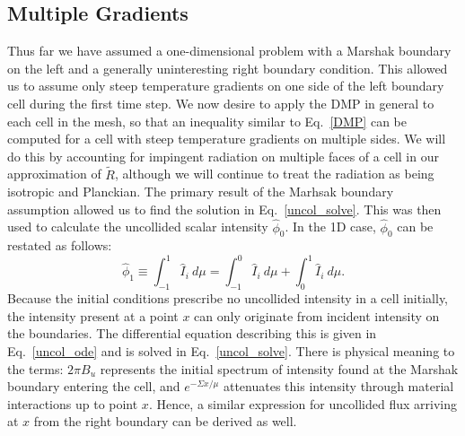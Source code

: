 %
%
\aboveSubSecSkip
\subsection{Multiple Gradients}
Thus far we have assumed a one-dimensional problem with a Marshak boundary on the
left and a generally uninteresting right boundary condition. 
This allowed us to assume only steep temperature gradients on one side of the
left boundary cell during the first time step. We now desire to apply the DMP in
general to each cell in the mesh, so
that an inequality similar to Eq.\ \eqref{DMP} can be computed for a cell with
steep temperature gradients on
multiple sides.  We will do this by accounting for impingent radiation on
multiple faces of a cell in our approximation of $\tilde R$, although we will continue to treat the radiation as
being isotropic and Planckian.  The primary result of the Marhsak boundary assumption
allowed us to
find the solution in Eq.\ \eqref{uncol_solve}.  This was then used to calculate
the uncollided scalar intensity $\hat\phi_0$.  In the 1D case, $\hat\phi_0$ can
be restated as follows:
\begin{equation}
\hat\phi_1\equiv\int_{-1}^1 \hat I_i\ d\mu = \int_{-1}^0 \hat I_i\ d\mu + 
  \int_0^1 \hat I_i\ d\mu. \label{uncol_gen}
\end{equation}
Because the initial conditions prescribe no uncollided intensity in a cell
initially, the intensity present at a point $x$ can only originate from incident
intensity on the boundaries.  The differential equation describing this is
given in Eq.\ \eqref{uncol_ode} and is solved in Eq.\ \eqref{uncol_solve}. 
There is physical meaning to the terms: $2\pi B_u$ represents the initial
spectrum of intensity found at the Marshak boundary entering the cell, and
$e^{-\Sigma x/\mu}$ attenuates this intensity through material interactions up
to point $x$.  Hence, a similar expression for uncollided flux arriving at $x$
from the right boundary can be derived as well.


